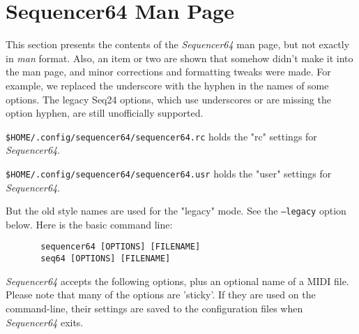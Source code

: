 %
%
%

\section{Sequencer64 Man Page}
\label{sec:seq64_man_page}

   This section presents the contents of the \textsl{Sequencer64} man page, but
   not exactly in \textsl{man} format.  Also, an item or two are shown that
   somehow didn't make it into the man page, and minor corrections and
   formatting tweaks were made.
   For example, we replaced the underscore with the hyphen in the names of some
   options.  The legacy Seq24 options, which use underscores or are missing the
   option hyphen, are still unofficially supported.

   \texttt{\$HOME/.config/sequencer64/sequencer64.rc} holds the "rc" settings
   for \textsl{Sequencer64}.

   \texttt{\$HOME/.config/sequencer64/sequencer64.usr} holds the "user" settings
   for \textsl{Sequencer64}.

   But the old style names are used for the "legacy" mode.  See the
   \texttt{--legacy} option below. Here is the basic command line:


   \begin{verbatim}
       sequencer64 [OPTIONS] [FILENAME]
       seq64 [OPTIONS] [FILENAME]
   \end{verbatim}

   \textsl{Sequencer64} accepts the following options, plus an optional name of
   a MIDI file.  Please note that many of the options are 'sticky'.  If they
   are used on the command-line, their settings are saved to the configuration
   files when \textsl{Sequencer64} exits.

   \setcounter{ItemCounter}{0}      %

